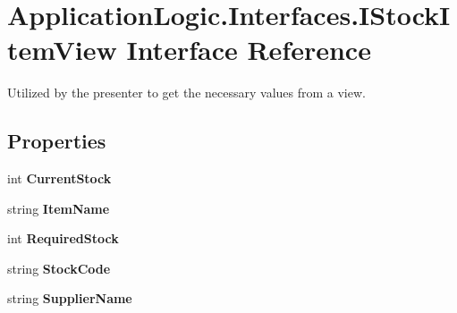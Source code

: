 \hypertarget{interface_application_logic_1_1_interfaces_1_1_i_stock_item_view}{
\section{ApplicationLogic.Interfaces.IStockItemView Interface Reference}
\label{interface_application_logic_1_1_interfaces_1_1_i_stock_item_view}
}


Utilized by the presenter to get the necessary values from a view.  


\subsection*{Properties}
\begin{DoxyCompactItemize}
\item 
\hypertarget{interface_application_logic_1_1_interfaces_1_1_i_stock_item_view_aea516db6e649e67eb5b84c61dc672fa9}{
int {\bfseries CurrentStock}}
\label{interface_application_logic_1_1_interfaces_1_1_i_stock_item_view_aea516db6e649e67eb5b84c61dc672fa9}

\item 
\hypertarget{interface_application_logic_1_1_interfaces_1_1_i_stock_item_view_a7b928c3d6bef8ec611820febcf554ec5}{
string {\bfseries ItemName}}
\label{interface_application_logic_1_1_interfaces_1_1_i_stock_item_view_a7b928c3d6bef8ec611820febcf554ec5}

\item 
\hypertarget{interface_application_logic_1_1_interfaces_1_1_i_stock_item_view_af56639a73526b60067f775ef7f3d2906}{
int {\bfseries RequiredStock}}
\label{interface_application_logic_1_1_interfaces_1_1_i_stock_item_view_af56639a73526b60067f775ef7f3d2906}

\item 
\hypertarget{interface_application_logic_1_1_interfaces_1_1_i_stock_item_view_a68d7bf40d969e85d2a7ff281e49f043e}{
string {\bfseries StockCode}}
\label{interface_application_logic_1_1_interfaces_1_1_i_stock_item_view_a68d7bf40d969e85d2a7ff281e49f043e}

\item 
\hypertarget{interface_application_logic_1_1_interfaces_1_1_i_stock_item_view_afce2a3abfd8cf4db7ca022f24ae46b62}{
string {\bfseries SupplierName}}
\label{interface_application_logic_1_1_interfaces_1_1_i_stock_item_view_afce2a3abfd8cf4db7ca022f24ae46b62}


\end{DoxyCompactItemize}
